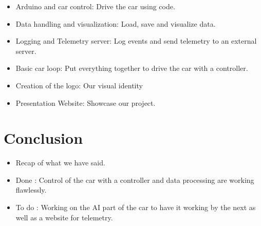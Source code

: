 \documentclass[11pt]{article}
\begin{document}
\begin{itemize}

\item Arduino and car control: Drive the car using code. %
\item Data handling and visualization: Load, save and visualize data. %
\item Logging and Telemetry server: Log events and send telemetry to an external server. %
\item Basic car loop: Put everything together to drive the car with a controller. %
\item Creation of the logo: Our visual identity %
\item Presentation Website: Showcase our project. %

\end{itemize}

\section {Conclusion}

\begin{itemize}
\item Recap of what we have said.
\item Done : Control of the car with a controller and data processing are working flawlessly.

\item To do : Working on the AI part of the car to have it working by the next as well as a website for telemetry.
\end{itemize}
\end{document}
